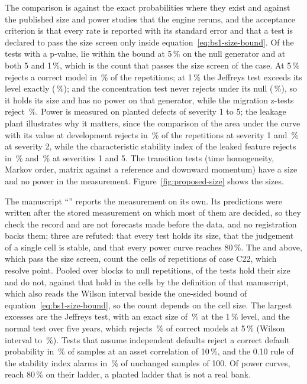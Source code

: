 The comparison is against the exact probabilities where they exist and against the published size and power studies that the engine reruns, and
the acceptance criterion is that every rate is reported with its standard error and that a test is declared to pass the size screen only inside
equation~\eqref{eq:bs1-size-bound}. Of the \pxOneTests{} tests with a p-value, \pxOneHoldFive{} lie within the bound at 5\,\% on the null generator and \pxOneWithinBoth{} at both 5 and 1\,\%, which is the count that passes the size screen of the case.
At 5\,\% \pxOneOverName{} rejects a correct model in \pxOneOverRate{}\,\% of the repetitions; at 1\,\% the Jeffreys test exceeds its level exactly
(\pxOneJeffExactOne{}\,\%); and the concentration test never rejects under its null (\pxOneHhiRate{}\,\%), so it holds its size and has no power on
that generator, while the migration z-tests reject \pxOneMigRate{}\,\%. Power is measured on planted defects of severity 1
to 5; the leakage plant illustrates why it matters, since the comparison of the area under the curve with its value at development rejects in
\pxOneLeakAucOne{}\,\% of the repetitions at severity 1 and \pxOneLeakAucTwo{}\,\% at severity 2, while the characteristic stability index of the leaked
feature rejects in \pxOneLeakCsiOne{}\,\% and \pxOneLeakCsiFive{}\,\% at severities 1 and 5. The transition tests (time homogeneity, Markov order,
matrix against a reference and downward momentum) have a size and no power in the measurement. Figure~\ref{fig:proposed-size} shows the sizes.

The manuscript ``\pxPaperTitleOne{}'' reports the measurement on its own. Its predictions were written after the stored measurement on which
most of them are decided, so they check the record and are not forecasts made before the data, and no registration backs them; three are refuted: that
every test holds its size, that the judgement of a single cell is stable, and that every power curve reaches 80\,\%. The \pxOneHoldFive{} and
\pxOneWithinBoth{} above, which pass the size screen, count the cells of \pxPpOneNullReps{} repetitions of case C22, which resolve \pxPpOneRes{} point. Pooled over blocks to
\pxPpOneReps{} null repetitions, \pxPpOneHold{} of the \pxPpOneTests{} tests hold their size and \pxPpOneNotHold{} do not, against \pxPpOneHoldCell{}
that hold in the cells by the definition of that manuscript, which also reads the Wilson interval beside the one-sided bound of equation~\eqref{eq:bs1-size-bound}, so the count depends on the cell size. The largest excesses are the Jeffreys test, with an exact size of \pxPpOneJeffExact{}\,\%
at the 1\,\% level, and the normal test over five years, which rejects \pxPpOneNorm{}\,\% of correct models at 5\,\% (Wilson interval \pxPpOneNormLo{}
to \pxPpOneNormHi{}\,\%). Tests that assume independent defaults reject a correct default probability in \pxPpOneBinRho{}\,\% of samples at an
asset correlation of 10\,\%, and the 0.10 rule of the stability index alarms in \pxPpOnePsi{}\,\% of unchanged samples of 100. Of \pxPpOnePowerTests{}
power curves, \pxPpOneReach{} reach 80\,\% on their ladder, a planted ladder that is not a real bank.

